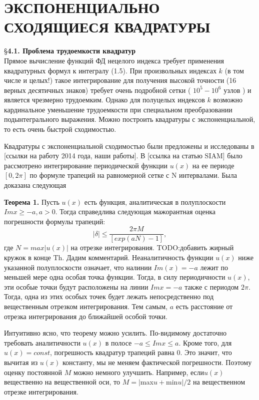 \chapter{ЭКСПОНЕНЦИАЛЬНО СХОДЯЩИЕСЯ КВАДРАТУРЫ}

\S \textbf{4.1. Проблема трудоемкости квадратур}
\\

Прямое вычисление функций ФД нецелого индекса требует применения
квадратурных формул к интегралу (1.5). При произвольных индексах $k$ (в том числе и целых!) такое интегрирование для получения высокой точности (16 верных десятичных знаков) требует очень подробной сетки ( $10^5 - 10^6$ узлов ) и является чрезмерно трудоемким. Однако для полуцелых индексов $k$
возможно кардинальное уменьшение трудоемкости при специальном
преобразовании подынтегрального выражения. Можно построить квадратуры с
экспоненциальной, то есть очень быстрой сходимостью.

Квадратуры с экспоненциальной сходимостью были предложены и исследованы в [ссылки на работу 2014 года, наши работы]. В [ссылка на статью SIAM] было рассмотрено интегрирование периодической функции $u(x)$ на ее периоде $[0,2\pi]$ по формуле трапеций на равномерной сетке с N интервалами. Была доказана следующая

\textbf{Теорема 1.} Пусть $u(x)$ есть функция, аналитическая в полуплоскости $Imx \geqslant -a, a > 0$. Тогда справедлива следующая мажорантная оценка погрешности формулы трапеций:
\begin{equation}
|\delta| \leqslant \frac{2\pi M}{[exp(aN)-1]},
\label{eq:ref4_1}
\end{equation}
где $N=max|u(x)|$ на отрезке интегрирования. TODO:добавить жирный кружок в конце Th.
Дадим комментарий. Неаналитичность функции $u(x)$ ниже указанной полуплоскости означает, что налинии $Im(x)=-a$ лежит по меньшей мере одна особая точка функции. Тогда, в силу периодичности $u(x)$, эти особые точки будут расположены на линии $Imx=-a$ также с периодом $2\pi$. Тогда, одна из этих особых точек будет лежать непосредственно под вещественным отрезком интегрирования. Тем самым, $a$ есть расстояние от отрезка интегрирования до ближайшей особой точки.

Интуитивно ясно, что теорему можно усилить. По-видимому достаточно требовать аналитичности $u(x)$ в полосе  $-a \leqslant Im x \leqslant a$. Кроме того, для $u(x)=const$, погрешность квадратур трапеций равна 0. Это значит, что вычитая из $u(x)$ константу, мы не меняем фактической погрешности. Поэтому оценку постоянной $M$ можно немного улучшить. Например, $если u(x)$ вещественно на вещественной оси, то $M=|$max$u+$min$u|/2$ на вещественном отрезке интегрирования. 

